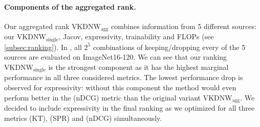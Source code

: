 \paragraph{Components of the aggregated rank.}
Our aggregated rank $\text{VKDNW}_{\text{agg}}$ combines information from 5 different sources: our $\text{VKDNW}_{\text{single}}$, Jacov, expressivity, trainability and FLOPs (see \cref{subsec:ranking}). In , all $2^5$ combinations of keeping/dropping every of the 5 sources are evaluated on ImageNet16-120. We can see that our ranking $\text{VKDNW}_{\text{single}}$ is the strongest component as it has the highest marginal performance in all three considered metrics. The lowest performance drop is observed for expressivity: without this component the method would even perform better in the (nDCG) metric than the original variant $\text{VKDNW}_{\text{agg}}$. We decided to include expressivity in the final ranking as we optimized for all three metrics (KT), (SPR) and (nDCG) simultaneously.


